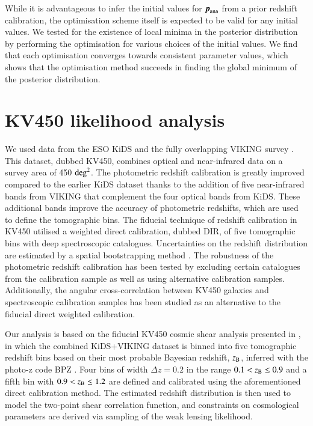 \documentclass{aa}
\begin{document}
While it is advantageous to infer the initial values for $\boldsymbol{p}_{\rm ana}$ from a prior redshift calibration, the optimisation scheme itself is expected to be valid for any initial values. We tested for the existence of local minima in the posterior distribution by performing the optimisation for various choices of the initial values. We find that each optimisation converges towards consistent parameter values, which shows that the optimisation method succeeds in finding the global minimum of the posterior distribution.
\section{KV450 likelihood analysis}
\label{sec:results}
We used data from the ESO KiDS \citep{kuijken15, kuijken19,dejong15,dejong17} and the fully overlapping VIKING survey \citep{2013Msngr.154...32E}. This dataset, dubbed KV450, combines optical and near-infrared data on a survey area of 450 ${\rm deg}^2$. The photometric redshift calibration is greatly improved compared to the earlier KiDS dataset \citep{hildebrandt17} thanks to the addition of five near-infrared bands from VIKING that complement the four optical bands from KiDS. These additional bands improve the accuracy of photometric redshifts, which are used to define the tomographic bins. The fiducial technique of redshift calibration in KV450 utilised a weighted direct calibration, dubbed DIR, of five tomographic bins with deep spectroscopic catalogues. Uncertainties on the redshift distribution are estimated by a spatial bootstrapping method \citep{hildebrandt18}. The robustness of the photometric redshift calibration has been tested by excluding certain catalogues from the calibration sample as well as using alternative calibration samples. Additionally, the angular cross-correlation between KV450 galaxies and spectroscopic calibration samples has been studied as an alternative to the fiducial direct weighted calibration.

Our analysis is based on the fiducial KV450 cosmic shear analysis presented in \cite{hildebrandt18}, in which the combined KiDS+VIKING dataset \citep{2019A&A...632A..34W} is binned into five tomographic redshift bins based on their most probable Bayesian redshift, $z_{\rm B}$, inferred with the photo-z code {\sc BPZ} \citep{2000ApJ...536..571B}. Four bins of width $\Delta z = 0.2$ in the range $0.1 < z_{\rm B} \leq 0.9$ and a fifth bin with $0.9 < z_{\rm B} \leq 1.2$ are defined and calibrated using the aforementioned direct calibration method. The estimated redshift distribution is then used to model the two-point shear correlation function, and constraints on cosmological parameters are derived via sampling of the weak lensing likelihood. 
\end{document}
